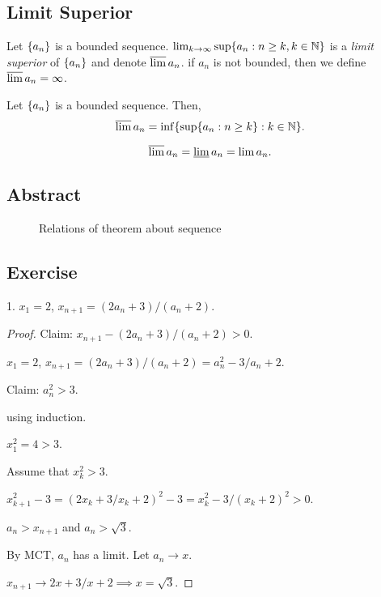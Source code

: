 \subsection{Limit Superior}

\begin{definition}
  Let $\set{a_n}$ is a bounded sequence. $\lim_{k \to \infty} \sup\set{a_n: n
      \ge k, k \in \NN}$ is a \emph{limit superior} of $\set{a_n}$ and denote
  $\varlimsup a_n$.
  if $a_n$ is not bounded, then we define $\varlimsup a_n = \infty$.
  \label{def:lim_sup}
\end{definition}


\begin{theorem}
  Let $\set{a_n}$ is a bounded sequence. Then,
  \begin{equation}
    \varlimsup a_n = \inf\set{\sup\set{a_n: n \ge k}: k \in \NN}.
  \end{equation}
  \label{thm:lim_sup_inf}
\end{theorem}

\begin{theorem}
  \begin{equation}
    \varlimsup a_n = \varliminf a_n = \lim a_n.
  \end{equation}
  \label{thm:lim_sup}
\end{theorem}

\subsection{Abstract}

\begin{figure}[H]
  \centering
  \begin{tikzpicture}

  \end{tikzpicture}
  \caption{Relations of theorem about sequence}
  \label{fig:}
\end{figure}


\subsection{Exercise}

1. $x_1 = 2$, $x_{n+1} = (2a_n + 3) / (a_n + 2)$.
\begin{proof}
  Claim: $x_{n+1} - (2a_n + 3) / (a_n + 2) > 0$.

  $x_1 = 2$, $x_{n+1} = (2a_n + 3) / (a_n + 2)  = a_n^2 - 3 / a_n + 2$.

  Claim: $a_n^2 > 3$.

  using induction.

  $x_1^2 = 4 > 3$.

  Assume that $x_k^2 > 3$.

  $x_{k+1}^2 - 3 = (2x_k + 3 / x_k + 2)^2 - 3 = x_k^2 - 3 / (x_k + 2)^2 > 0$.

  $a_n > x_{n+1}$ and $a_n > \sqrt{3}$.

  By MCT, $a_n$ has a limit. Let $a_n \to x$.

  $x_{n+1} \to 2x + 3 / x + 2 \implies x = \sqrt{3}$.
\end{proof}

